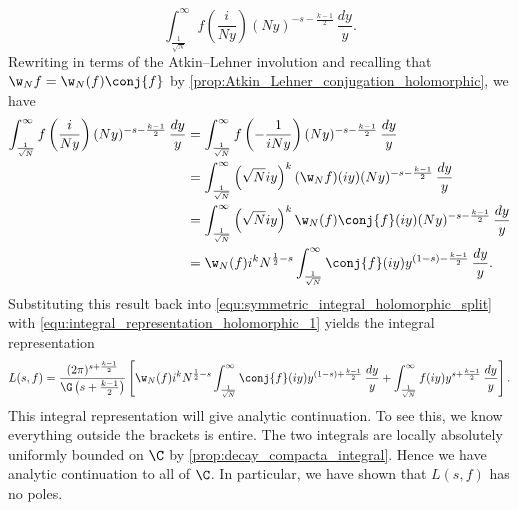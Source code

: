       \[
        \int_{\frac{1}{\sqrt{N}}}^{\infty}f\left(\frac{i}{Ny}\right)(Ny)^{-s-\frac{k-1}{2}}\,\frac{dy}{y}.
      \]
      Rewriting in terms of the Atkin–Lehner involution and recalling that $\w_{N}f = \w_{N}(f)\conj{f}$ by \cref{prop:Atkin_Lehner_conjugation_holomorphic}, we have
      \begin{align*}
        \int_{\frac{1}{\sqrt{N}}}^{\infty}f\left(\frac{i}{Ny}\right)(Ny)^{-s-\frac{k-1}{2}}\,\frac{dy}{y} &= \int_{\frac{1}{\sqrt{N}}}^{\infty}f\left(-\frac{1}{iNy}\right)(Ny)^{-s-\frac{k-1}{2}}\,\frac{dy}{y} \\
        &= \int_{\frac{1}{\sqrt{N}}}^{\infty}\left(\sqrt{N}iy\right)^{k}(\w_{N}f)(iy)(Ny)^{-s-\frac{k-1}{2}}\,\frac{dy}{y} \\
        &= \int_{\frac{1}{\sqrt{N}}}^{\infty}\left(\sqrt{N}iy\right)^{k}\w_{N}(f)\conj{f}(iy)(Ny)^{-s-\frac{k-1}{2}}\,\frac{dy}{y} \\
        &= \w_{N}(f)i^{k}N^{\frac{1}{2}-s}\int_{\frac{1}{\sqrt{N}}}^{\infty}\conj{f}(iy)y^{(1-s)-\frac{k-1}{2}}\,\frac{dy}{y}.
      \end{align*}
      Substituting this result back into \cref{equ:symmetric_integral_holomorphic_split} with \cref{equ:integral_representation_holomorphic_1} yields the integral representation
      \[
        L(s,f) = \frac{(2\pi)^{s+\frac{k-1}{2}}}{\G\left(s+\frac{k-1}{2}\right)}\left[\w_{N}(f)i^{k}N^{\frac{1}{2}-s}\int_{\frac{1}{\sqrt{N}}}^{\infty}\conj{f}(iy)y^{(1-s)+\frac{k-1}{2}}\,\frac{dy}{y}+\int_{\frac{1}{\sqrt{N}}}^{\infty}f(iy)y^{s+\frac{k-1}{2}}\,\frac{dy}{y}\right].
      \]
      This integral representation will give analytic continuation. To see this, we know everything outside the brackets is entire. The two integrals are locally absolutely uniformly bounded on $\C$ by \cref{prop:decay_compacta_integral}. Hence we have analytic continuation to all of $\C$. In particular, we have shown that $L(s,f)$ has no poles.
